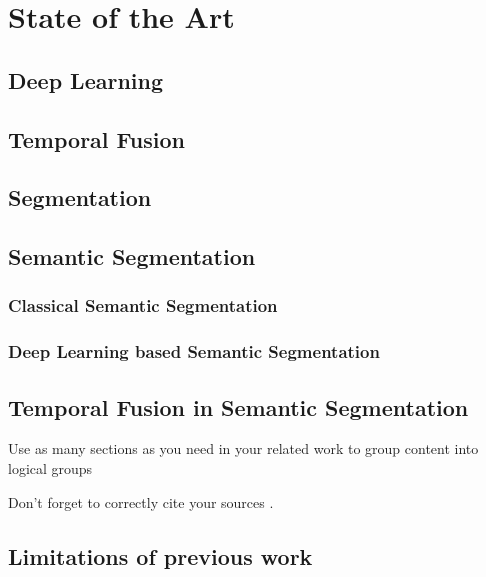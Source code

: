 

    \chapter{State of the Art}

    \section{Deep Learning}
    \section{Temporal Fusion}
    \section{Segmentation}
    \section{Semantic Segmentation}
    \subsection{Classical Semantic Segmentation}
    \subsection{Deep Learning based  Semantic Segmentation}
    \section{Temporal Fusion in Semantic Segmentation}
    Use as many sections as you need in your related work to group content into logical groups

    Don't forget to correctly cite your sources \cite{art1}.
    \section{Limitations of previous work}

